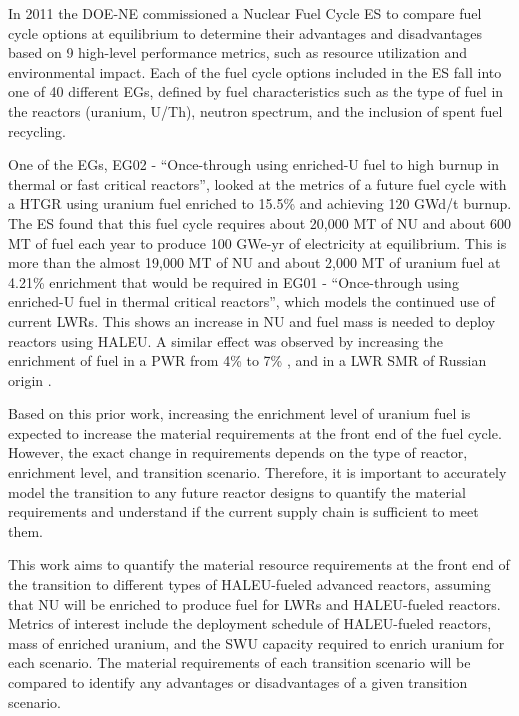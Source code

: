 \documentclass[preprint]{elsarticle}
\begin{document}
In 2011 the \gls{DOE-NE} commissioned a Nuclear Fuel Cycle \gls{ES} 
\cite{wigeland_nuclear_2014} to compare fuel cycle options at equilibrium
to determine their advantages and disadvantages
based on 9 high-level performance metrics, such as resource utilization and 
environmental impact. Each of the fuel cycle options included in the 
\gls{ES} fall into one of 40 different \glspl{EG}, defined by fuel 
characteristics such as the type of fuel in the reactors (uranium, 
U/Th), neutron spectrum, and the inclusion of spent fuel recycling. 

One of the \glspl{EG}, \gls{EG}02 - ``Once-through using enriched-U fuel to 
high burnup in thermal or fast critical reactors'', looked at the metrics 
of a future fuel cycle with a \gls{HTGR} using uranium fuel enriched to 
15.5\% and achieving 120 GWd/t burnup. The \gls{ES} found that this fuel cycle
requires about 20,000 MT of \gls{NU} and about 600 MT of fuel each year 
to produce 100 GWe-yr of electricity at equilibrium. This is more than the 
almost 19,000 MT of \gls{NU} and about 2,000 MT of uranium fuel at 4.21\%
enrichment that would be required in \gls{EG}01 - ``Once-through using enriched-U 
fuel in thermal critical reactors'', which models the continued use of current 
\glspl{LWR}. This shows an increase in \gls{NU} and fuel mass is needed to 
deploy reactors using \gls{HALEU}.
A similar effect was observed by increasing the enrichment of fuel in a 
\gls{PWR} from 4\% to 7\% \cite{burns_reactor_2020}, and in a \gls{LWR}
\gls{SMR} of Russian origin \cite{hernandez_potential_2020}. 

Based on this prior work, increasing the enrichment level of uranium fuel 
is expected to  
increase the material requirements at the front end of 
the fuel cycle. However, the exact change in requirements depends 
on the type of reactor, enrichment level, and transition scenario.
Therefore, it is important to accurately model the transition to any future
reactor designs to quantify the material requirements and understand
if the current supply chain is sufficient to meet them. 

This work aims to quantify the material resource requirements at the front 
end of the 
transition to different types of \gls{HALEU}-fueled advanced reactors, 
assuming that \gls{NU} will be enriched to produce fuel for \glspl{LWR} and 
\gls{HALEU}-fueled reactors. 
Metrics of interest include the deployment schedule of \gls{HALEU}-fueled 
reactors, mass of enriched uranium, and the \gls{SWU} capacity required to 
enrich uranium for each scenario. The material requirements of each transition 
scenario will be compared to identify any advantages or disadvantages of 
a given transition scenario. 
\end{document}
